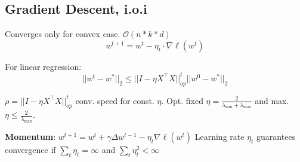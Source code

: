 \subsection*{Gradient Descent, i.o.i}
Converges only for convex case. $\mathcal{O}(n * k * d)$
$$
	w^{t+1} = w^t - \eta_t \cdot \nabla \ell(w^t)
$$

For linear regression:
$$
	||w^t - w^*||_2 \leq ||I - \eta X^\top X||_{op}^t ||w^0 - w^*||_2
$$

$\rho = ||I - \eta X^\top X||_{op}^t$ conv. speed for const. $\eta$. Opt. fixed $\eta = \frac{2}{\lambda_{\text{min}} + \lambda_{\text{max}}}$ and max. $\eta \leq \frac{2}{\lambda_{\text{max}}}$. 

\textbf{Momentum}: $w^{t+1} = w^t + \gamma \Delta w^{t-1} - \eta_t \nabla \ell(w^t)$
Learning rate $\eta_t$ guarantees convergence if $\sum_t \eta_t = \infty$ and $\sum_t \eta_t^2 < \infty$
